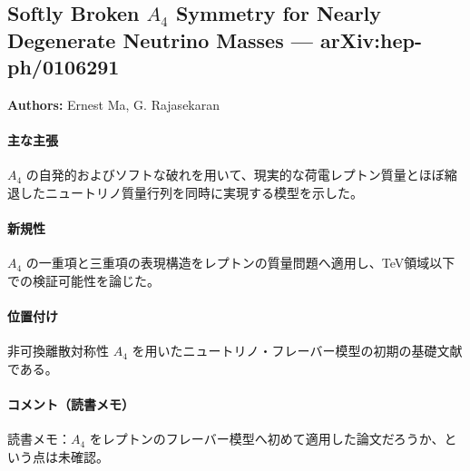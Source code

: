 \subsection{Softly Broken $A_4$ Symmetry for Nearly Degenerate Neutrino Masses --- arXiv:hep-ph/0106291}

\textbf{Authors:} Ernest Ma, G. Rajasekaran

\paragraph{主な主張}
$A_4$ の自発的およびソフトな破れを用いて、現実的な荷電レプトン質量とほぼ縮退したニュートリノ質量行列を同時に実現する模型を示した\cite{Ma:2001dn}。

\paragraph{新規性}
$A_4$ の一重項と三重項の表現構造をレプトンの質量問題へ適用し、TeV領域以下での検証可能性を論じた。

\paragraph{位置付け}
非可換離散対称性 $A_4$ を用いたニュートリノ・フレーバー模型の初期の基礎文献である。

\paragraph{コメント（読書メモ）}
読書メモ：$A_4$ をレプトンのフレーバー模型へ初めて適用した論文だろうか、という点は未確認。
